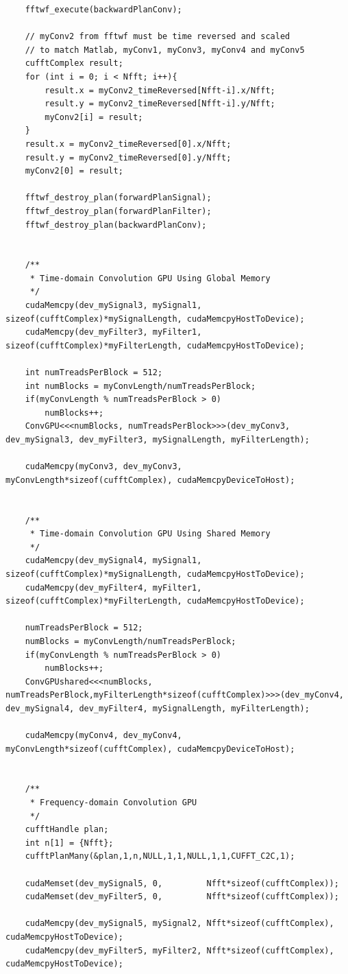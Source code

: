 \begin{lstlisting}
	fftwf_execute(backwardPlanConv);

	// myConv2 from fftwf must be time reversed and scaled
	// to match Matlab, myConv1, myConv3, myConv4 and myConv5
	cufftComplex result;
	for (int i = 0; i < Nfft; i++){
		result.x = myConv2_timeReversed[Nfft-i].x/Nfft;
		result.y = myConv2_timeReversed[Nfft-i].y/Nfft;
		myConv2[i] = result;
	}
	result.x = myConv2_timeReversed[0].x/Nfft;
	result.y = myConv2_timeReversed[0].y/Nfft;
	myConv2[0] = result;

	fftwf_destroy_plan(forwardPlanSignal);
	fftwf_destroy_plan(forwardPlanFilter);
	fftwf_destroy_plan(backwardPlanConv);


	/**
	 * Time-domain Convolution GPU Using Global Memory
	 */
	cudaMemcpy(dev_mySignal3, mySignal1, sizeof(cufftComplex)*mySignalLength, cudaMemcpyHostToDevice);
	cudaMemcpy(dev_myFilter3, myFilter1, sizeof(cufftComplex)*myFilterLength, cudaMemcpyHostToDevice);

	int numTreadsPerBlock = 512;
	int numBlocks = myConvLength/numTreadsPerBlock;
	if(myConvLength % numTreadsPerBlock > 0)
		numBlocks++;
	ConvGPU<<<numBlocks, numTreadsPerBlock>>>(dev_myConv3, dev_mySignal3, dev_myFilter3, mySignalLength, myFilterLength);

	cudaMemcpy(myConv3, dev_myConv3, myConvLength*sizeof(cufftComplex), cudaMemcpyDeviceToHost);


	/**
	 * Time-domain Convolution GPU Using Shared Memory
	 */
	cudaMemcpy(dev_mySignal4, mySignal1, sizeof(cufftComplex)*mySignalLength, cudaMemcpyHostToDevice);
	cudaMemcpy(dev_myFilter4, myFilter1, sizeof(cufftComplex)*myFilterLength, cudaMemcpyHostToDevice);

	numTreadsPerBlock = 512;
	numBlocks = myConvLength/numTreadsPerBlock;
	if(myConvLength % numTreadsPerBlock > 0)
		numBlocks++;
	ConvGPUshared<<<numBlocks, numTreadsPerBlock,myFilterLength*sizeof(cufftComplex)>>>(dev_myConv4, dev_mySignal4, dev_myFilter4, mySignalLength, myFilterLength);

	cudaMemcpy(myConv4, dev_myConv4, myConvLength*sizeof(cufftComplex), cudaMemcpyDeviceToHost);


	/**
	 * Frequency-domain Convolution GPU
	 */
	cufftHandle plan;
	int n[1] = {Nfft};
	cufftPlanMany(&plan,1,n,NULL,1,1,NULL,1,1,CUFFT_C2C,1);

	cudaMemset(dev_mySignal5, 0, 	     Nfft*sizeof(cufftComplex));
	cudaMemset(dev_myFilter5, 0, 	     Nfft*sizeof(cufftComplex));

	cudaMemcpy(dev_mySignal5, mySignal2, Nfft*sizeof(cufftComplex), cudaMemcpyHostToDevice);
	cudaMemcpy(dev_myFilter5, myFilter2, Nfft*sizeof(cufftComplex), cudaMemcpyHostToDevice);


\end{lstlisting}
